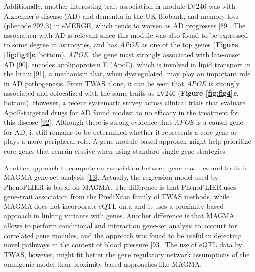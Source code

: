 Additionally, another interesting trait association in module LV246 was with Alzheimer's disease (AD) and dementia in the UK Biobank, and memory loss (phecode 292.3) in eMERGE, which tends to worsen as AD progresses {[}\protect\hyperlink{ref-Vxi0ejah}{89}{]}.
The association with AD is relevant since this module was also found to be expressed to some degree in astrocytes, and has \emph{APOE} as one of the top genes (\textbf{Figure \ref{fig:fig4}\emph{e}}, bottom).
\emph{APOE}, the gene most strongly associated with late-onset AD {[}\protect\hyperlink{ref-hn3T60wf}{90}{]}, encodes apolipoprotein E (ApoE), which is involved in lipid transport in the brain {[}\protect\hyperlink{ref-10ZgydXh1}{91}{]}, a mechanism that, when dysregulated, may play an important role in AD pathogenesis.
From TWAS alone, it can be seen that \emph{APOE} is strongly associated and colocalized with the same traits as LV246 (\textbf{Figure \ref{fig:fig4}\emph{e}}, bottom).
However, a recent systematic survey across clinical trials that evaluate ApoE-targeted drugs for AD found modest to no efficacy in the treatment for this disease {[}\protect\hyperlink{ref-UadQwQsF}{92}{]}.
Although there is strong evidence that \emph{APOE} is a causal gene for AD, it still remains to be determined whether it represents a core gene or plays a more peripheral role.
A gene module-based approach might help prioritize core genes that remain elusive when using standard single-gene strategies.

Another approach to compute an association between gene modules and traits is MAGMA gene-set analysis {[}\protect\hyperlink{ref-19XiXgYmd}{13}{]}.
Actually, the regression model used by PhenoPLIER is based on MAGMA.
The difference is that PhenoPLIER uses gene-trait association from the PrediXcan family of TWAS methods, while MAGMA does not incorporate eQTL data and it uses a proximity-based approach in linking variants with genes.
Another difference is that MAGMA allows to perform conditional and interaction gene-set analysis to account for correlated gene modules, and the approach was found to be useful in detecting novel pathways in the context of blood pressure {[}\protect\hyperlink{ref-Om8ZhS06}{93}{]}.
The use of eQTL data by TWAS, however, might fit better the gene regulatory network assumptions of the omnigenic model than proximity-based approaches like MAGMA.

